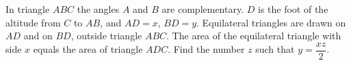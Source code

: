 In triangle $ABC$ the angles $A$ and $B$ are complementary. $D$ is the foot of the altitude from $C$ to $AB$, and $AD=x$, $BD=y$. Equilateral triangles are drawn on $AD$ and on $BD$, outside triangle $ABC$. The area of the equilateral triangle with side $x$ equals the area of triangle $ADC$. Find the number $z$ such that $y=\dfrac{xz}{2}$.
